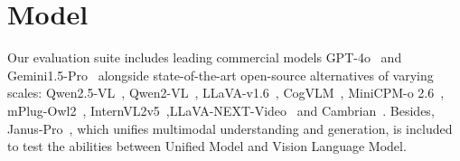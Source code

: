 \section{Model}
\label{appendix:model}
Our evaluation suite includes leading commercial models GPT-4o~\cite{hurst2024gpt40} and Gemini1.5-Pro~\cite{Gemini} alongside state-of-the-art open-source alternatives of varying scales: Qwen2.5-VL~\cite{qwen2.5-VL}, Qwen2-VL~\cite{wang2024qwen2}, LLaVA-v1.6~\cite{liu2023llava}, CogVLM~\cite{wang2023cogvlm}, MiniCPM-o 2.6~\cite{yao2024minicpm}, mPlug-Owl2~\cite{ye2023mplugowl2}, InternVL2v5~\cite{chen2024internvl},LLaVA-NEXT-Video~\cite{zhang2024llavanextvideo} and Cambrian~\cite{tong2024cambrian1}. Besides, Janus-Pro~\cite{chen2025januspro}, which unifies multimodal understanding and generation, is included to test the abilities between Unified Model and Vision Language Model.









